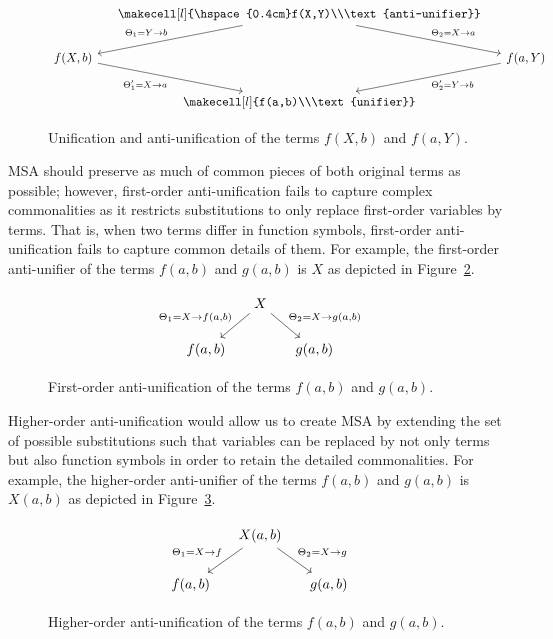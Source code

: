 \begin{figure} [t]
  \[
\begin{tikzcd}[column sep=small]
&
  {\makecell[l]{\hspace{0.4cm}f(X,Y)\\\text{anti-unifier}}}
  \arrow{dr}{\Theta_2 = X \rightarrow a}
  \arrow[->,swap]{dl}{\Theta_1 = Y \rightarrow b} %
\\
f(X,b)
 \arrow[->,swap]{dr}{\Theta_1' = X \rightarrow a}
&&
f(a, Y)
  \arrow{dl}{\Theta_2' = Y \rightarrow b}
  \\
&
{\makecell[l]{f(a,b)\\\text{unifier}}}
\end{tikzcd}
\]
  \caption{Unification and anti-unification of the terms $f(X,b)$ and $f(a,Y)$.}
  \label{fig:uni-anti-uni}
\end{figure}

MSA should preserve as much of common pieces of both original terms as possible; however, first-order anti-unification fails to capture complex commonalities as it restricts substitutions to only replace first-order variables by terms. That is, when two terms differ in function symbols, first-order anti-unification fails to capture common details of them. For example, the first-order anti-unifier of the terms $f(a,b)$ and $g(a,b)$ is $X$ as depicted in Figure~\ref{fig:first-anti-uni}.

\begin{figure}[t]
\[
\begin{tikzcd}[column sep=small]
&
  X
  \arrow{dr}{\Theta_2 = X \rightarrow g(a,b)}
  \arrow[->,swap]{dl}{\Theta_1 = X \rightarrow f(a,b)} %
\\
f(a,b)
&&
g(a,b)
\end{tikzcd}
\]
  \caption{First-order anti-unification of the terms $f(a,b)$ and $g(a,b)$.}
  \label{fig:first-anti-uni}
\end{figure}

Higher-order anti-unification would allow us to create MSA by extending the set of possible substitutions such that variables can be replaced by not only terms but also function symbols in order to retain the detailed commonalities. For example, the higher-order anti-unifier of the terms $f(a,b)$ and $g(a,b)$ is $X(a,b)$ as depicted in Figure~\ref{fig:higher-anti-uni}.
\begin{figure}[t]
\[
\begin{tikzcd}[column sep=small]
&
  X(a,b)
  \arrow{dr}{\Theta_2 = X \rightarrow g}
  \arrow[->,swap]{dl}{\Theta_1 = X \rightarrow f} %
\\
f(a,b)
&&
g(a,b)
\end{tikzcd}
\]
  \caption{Higher-order anti-unification of the terms $f(a,b)$ and $g(a,b)$.}
  \label{fig:higher-anti-uni}
\end{figure}

